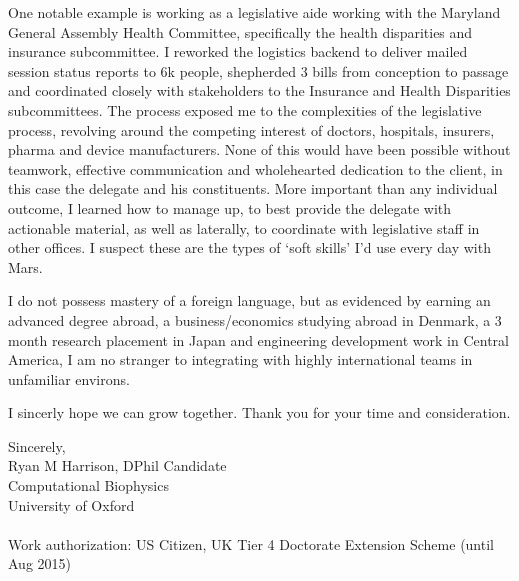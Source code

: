 \documentclass{../res}
\begin{document}
\begin{sloppypar}
\begin{resume}
One notable example is working as a legislative aide working with the Maryland General Assembly Health Committee, specifically the health disparities and insurance subcommittee. I reworked the logistics backend to deliver mailed session status reports to 6k people, shepherded 3 bills from conception to passage and coordinated closely with stakeholders to the Insurance and Health Disparities subcommittees. The process exposed me to the complexities of the legislative process, revolving around the competing interest of doctors, hospitals, insurers, pharma and device manufacturers. None of this would have been possible without teamwork, effective communication and wholehearted dedication to the client, in this case the delegate and his constituents. More important than any individual outcome, I learned how to manage up, to best provide the delegate with actionable material, as well as laterally, to coordinate with legislative staff in other offices. I suspect these are the types of `soft skills' I'd use every day with Mars.

I do not possess mastery of a foreign language, but as evidenced by earning an advanced degree abroad, a business/economics studying abroad in Denmark, a 3 month research placement in Japan and engineering development work in Central America, I am no stranger to integrating with highly international teams in unfamiliar environs.

I sincerly hope we can grow together. Thank you for your time and consideration.

Sincerely, \\
Ryan M Harrison, DPhil Candidate \\
Computational Biophysics \\
University of Oxford \\ \\
Work authorization: US Citizen, UK Tier 4 Doctorate Extension Scheme (until Aug 2015)
\end{resume} 
\end{sloppypar}
\end{document}
